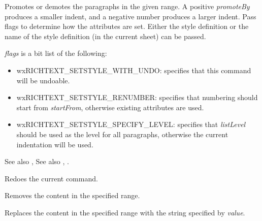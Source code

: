 
Promotes or demotes the paragraphs in the given range. A positive {\it promoteBy} produces a smaller indent, and a negative number
produces a larger indent. Pass flags to determine how the attributes are set.
Either the style definition or the name of the style definition (in the current sheet) can be passed.

{\it flags} is a bit list of the following:

\begin{itemize}\itemsep=0pt
\item wxRICHTEXT\_SETSTYLE\_WITH\_UNDO: specifies that this command will be undoable.
\item wxRICHTEXT\_SETSTYLE\_RENUMBER: specifies that numbering should start from {\it startFrom}, otherwise existing attributes are used.
\item wxRICHTEXT\_SETSTYLE\_SPECIFY\_LEVEL: specifies that {\it listLevel} should be used as the level for all paragraphs, otherwise the current indentation will be used.
\end{itemize}

See also , See also , .

\label{wxrichtextctrlredo}


Redoes the current command.

\label{wxrichtextctrlremove}


Removes the content in the specified range.

\label{wxrichtextctrlreplace}


Replaces the content in the specified range with the string specified by {\it value}.

\label{wxrichtextctrlsavefile}

